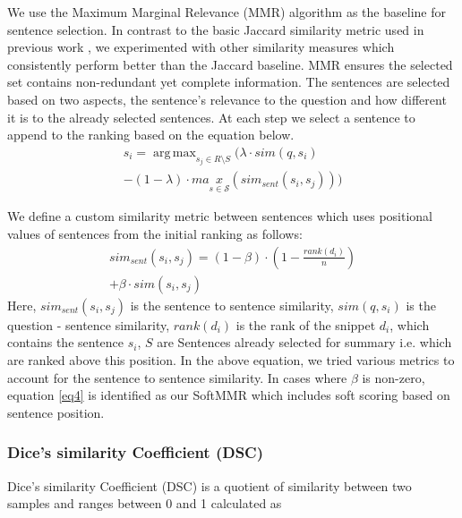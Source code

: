 \documentclass[11pt,a4paper]{article}
\DeclareMathOperator*{\argmax}{arg\,max}
\begin{document}
We use the Maximum Marginal Relevance (MMR) algorithm \cite{MMR} as the baseline for sentence selection. In contrast to the basic Jaccard similarity metric used in previous work \cite{khyati-paper}, we experimented with other similarity measures which consistently perform better than the Jaccard baseline. MMR ensures the selected set contains non-redundant yet complete information. The sentences are selected based on two aspects, the sentence's relevance to the question and how different it is to the already selected sentences. At each step we select a sentence to append to the ranking based on the equation below.
\vspace{-0.3cm}
\begin{multline}
     s_i = \argmax_{s_j\in R \setminus S} (\lambda \cdot sim(q, s_i)  \\  - (1 - \lambda) \cdot max\limits_{s \in \mathcal{S}}(sim_{sent}(s_i, s_j) ) ) \label{eq4}
\end{multline}
   
 We define a custom similarity metric between sentences which uses positional values of sentences from the initial ranking as follows:
 \vspace{-0.3cm}
\begin{multline}
  sim_{sent}(s_i, s_j) = ( 1 - \beta) \cdot (1 - \frac{rank(d_i)}{n}) \\+ \beta \cdot sim(s_i, s_j) \label{eq5}
\end{multline}
Here, $sim_{sent}(s_i, s_j)$ is the sentence to sentence similarity, $sim(q, s_i)$  is the question - sentence similarity, $rank(d_i)$ is the rank of the snippet $d_i$, which contains the sentence $s_i$, $S$ are Sentences already selected for summary i.e. which are ranked above this position. In the above equation, we tried various metrics to account for the sentence to sentence similarity. In cases where $\beta$ is non-zero, equation \ref{eq4} is identified as our SoftMMR which includes soft scoring based on sentence position.

\subsubsection{Dice's similarity Coefficient (DSC)}

Dice's similarity Coefficient (DSC) \cite{dice} is a quotient of similarity between two samples and ranges between 0 and 1 calculated as
\end{document}
